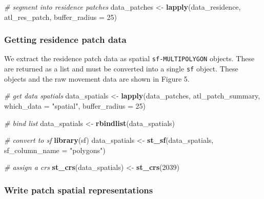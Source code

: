 \documentclass[]{scrartcl}
\newenvironment{Shaded}{}{}
\newcommand{\CommentTok}[1]{\textcolor[rgb]{0.38,0.63,0.69}{\textit{#1}}}
\newcommand{\DataTypeTok}[1]{\textcolor[rgb]{0.56,0.13,0.00}{#1}}
\newcommand{\DecValTok}[1]{\textcolor[rgb]{0.25,0.63,0.44}{#1}}
\newcommand{\KeywordTok}[1]{\textcolor[rgb]{0.00,0.44,0.13}{\textbf{#1}}}
\newcommand{\NormalTok}[1]{#1}
\newcommand{\StringTok}[1]{\textcolor[rgb]{0.25,0.44,0.63}{#1}}
\begin{document}
\begin{Shaded}
\begin{Highlighting}[]
\CommentTok{# segment into residence patches}
\NormalTok{data_patches <-}\StringTok{ }\KeywordTok{lapply}\NormalTok{(data_residence, atl_res_patch,}
                       \DataTypeTok{buffer_radius =} \DecValTok{25}\NormalTok{)}
\end{Highlighting}
\end{Shaded}

\hypertarget{getting-residence-patch-data}{%
\subsubsection{Getting residence patch data}\label{getting-residence-patch-data}}

We extract the residence patch data as spatial \texttt{sf-MULTIPOLYGON} objects.
These are returned as a list and must be converted into a single \texttt{sf} object.
These objects and the raw movement data are shown in Figure 5.

\begin{Shaded}
\begin{Highlighting}[]
\CommentTok{# get data spatials}
\NormalTok{data_spatials <-}\StringTok{ }\KeywordTok{lapply}\NormalTok{(data_patches, atl_patch_summary,}
                        \DataTypeTok{which_data =} \StringTok{"spatial"}\NormalTok{,}
                        \DataTypeTok{buffer_radius =} \DecValTok{25}\NormalTok{)}

\CommentTok{# bind list}
\NormalTok{data_spatials <-}\StringTok{ }\KeywordTok{rbindlist}\NormalTok{(data_spatials)}

\CommentTok{# convert to sf}
\KeywordTok{library}\NormalTok{(sf)}
\NormalTok{data_spatials <-}\StringTok{ }\KeywordTok{st_sf}\NormalTok{(data_spatials, }\DataTypeTok{sf_column_name =} \StringTok{"polygons"}\NormalTok{)}

\CommentTok{# assign a crs}
\KeywordTok{st_crs}\NormalTok{(data_spatials) <-}\StringTok{ }\KeywordTok{st_crs}\NormalTok{(}\DecValTok{2039}\NormalTok{)}
\end{Highlighting}
\end{Shaded}

\hypertarget{write-patch-spatial-representations}{%
\subsubsection{Write patch spatial representations}\label{write-patch-spatial-representations}}
\end{document}
